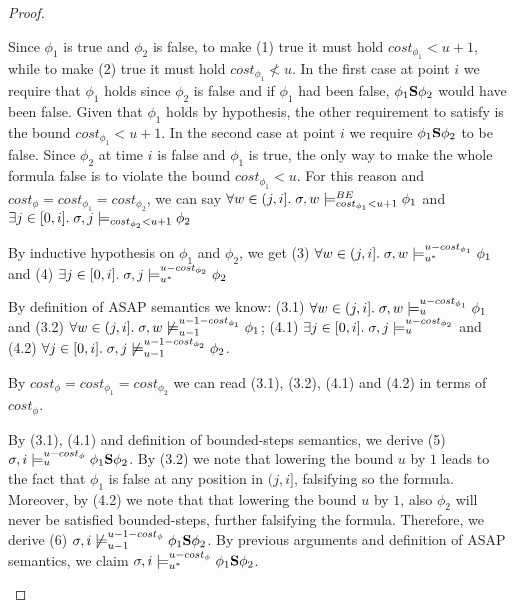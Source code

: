 \begin{theorem}
\begin{proof}
\begin{itemize}
\begin{itemize}
\begin{itemize}
            Since $\phi_1$ is true and $\phi_2$ is false, to make (1) true it must hold $cost_{\phi_1} < u + 1$, while to make (2) true it must hold $cost_{\phi_1} \not< u$.
            In the first case at point $i$ we require that $\phi_1$ holds since $\phi_2$ is false and if $\phi_1$ had been false, $\phi_1 \mathbf{S} \phi_2$ would have been false. 
            Given that $\phi_1$ holds by hypothesis, the other requirement to satisfy is the bound $cost_{\phi_1} < u + 1$.
            In the second case at point $i$ we require $\phi_1 \mathbf{S} \phi_2$ to be false. Since $\phi_2$ at time $i$ is false and $\phi_1$ is true, the only way to make the whole formula false is to violate the bound $cost_{\phi_1} < u$.
            For this reason and $cost_\phi = cost_{\phi_1} = cost_{\phi_2}$, we can say $\forall w \in (j,i].\; \sigma,w \models_{cost_{\phi_1} < u + 1}^{BE} \phi_1$ and $\exists j \in [0,i].\; \sigma,j \models_{cost_{\phi_2} < u + 1} \phi_2$
            
            By inductive hypothesis on $\phi_1$ and $\phi_2$, we get (3) $\forall w \in (j,i].\; \sigma,w \models_{{u}^*}^{u-cost_{\phi_1}} \phi_1$ and (4) $\exists j \in [0,i].\; \sigma,j \models_{{u}^*}^{u-cost_{\phi_2}} \phi_2$

            By definition of ASAP semantics we know: 
            (3.1) $\forall w \in (j,i].\; \sigma,w \models_{u}^{u-cost_{\phi_1}} \phi_1$ and 
            (3.2) $\forall w \in (j,i].\; \sigma,w \not\models_{u-1}^{u-1-cost_{\phi_1}} \phi_1$;
            (4.1) $\exists j \in [0,i].\; \sigma,j \models_{u}^{u-cost_{\phi_2}}$ and
            (4.2) $\forall j \in [0,i].\; \sigma,j \not\models_{u-1}^{u-1-cost_{\phi_2}} \phi_2$.

            By $cost_\phi = cost_{\phi_1} = cost_{\phi_2}$ we can read (3.1), (3.2), (4.1) and (4.2) in terms of $cost_\phi$.

            By (3.1), (4.1) and definition of bounded-steps semantics, we derive (5) $\sigma,i \models_{u}^{u-cost_\phi} \phi_1 \mathbf{S} \phi_2$.
            By (3.2) we note that lowering the bound $u$ by $1$ leads to the fact that $\phi_1$ is false at any position in $(j,i]$, falsifying so the formula.
            Moreover, by (4.2) we note that that lowering the bound $u$ by $1$, also $\phi_2$ will never be satisfied bounded-steps, further falsifying the formula.
            Therefore, we derive (6) $\sigma,i \not\models_{u-1}^{u-1-cost_\phi} \phi_1 \mathbf{S} \phi_2$.
            By previous arguments and definition of ASAP semantics, we claim $\sigma,i \models_{{u}^*}^{u-cost_\phi} \phi_1 \mathbf{S} \phi_2$.
        \end{itemize}
    \end{itemize}
\end{itemize}


\end{proof}
\end{theorem}
